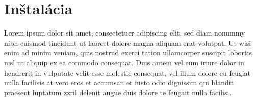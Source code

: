{
	\section{Inštalácia}
}
Lorem ipsum dolor sit amet, consectetuer adipiscing elit, sed diam nonummy nibh euismod tincidunt ut laoreet dolore magna aliquam erat volutpat. Ut wisi enim ad minim veniam, quis nostrud exerci tation ullamcorper suscipit lobortis nisl ut aliquip ex ea commodo consequat. Duis autem vel eum iriure dolor in hendrerit in vulputate velit esse molestie consequat, vel illum dolore eu feugiat nulla facilisis at vero eros et accumsan et iusto odio dignissim qui blandit praesent luptatum zzril delenit augue duis dolore te feugait nulla facilisi. 

